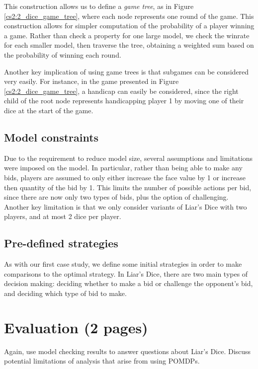 This construction allows us to define a \emph{game tree}, as in Figure \ref{cs2:2_dice_game_tree}, where each node represents one round of the game. This construction allows for simpler computation of the probability of a player winning a game. Rather than check a property for one large model, we check the winrate for each smaller model, then traverse the tree, obtaining a weighted sum based on the probability of winning each round.

Another key implication of using game trees is that subgames can be considered very easily. For instance, in the game presented in Figure \ref{cs2:2_dice_game_tree}, a handicap can easily be considered, since the right child of the root node represents handicapping player 1 by moving one of their dice at the start of the game.

\subsection{Model constraints}

Due to the requirement to reduce model size, several assumptions and limitations were imposed on the model. In particular, rather than being able to make any bids, players are assumed to only either increase the face value by 1 or increase then quantity of the bid by 1. This limits the number of possible actions per bid, since there are now only two types of bids, plus the option of challenging. Another key limitation is that we only consider variants of Liar's Dice with two players, and at most 2 dice per player.



\subsection{Pre-defined strategies}

As with our first case study, we define some initial strategies in order to make comparisons to the optimal strategy. In Liar's Dice, there are two main types of decision making: deciding whether to make a bid or challenge the opponent's bid, and deciding which type of bid to make.


\section{Evaluation (2 pages)}

Again, use model checking results to answer questions about Liar's Dice. Discuss potential limitations of analysis that arise from using POMDPs.

